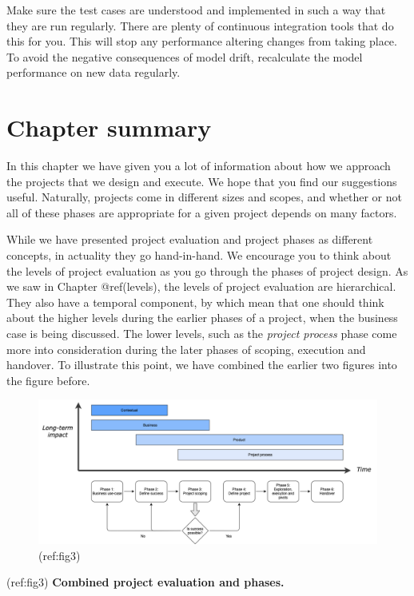 \documentclass[
]{book}
\begin{document}
Make sure the test cases are understood and implemented in such a way
that they are run regularly. There are plenty of continuous integration
tools that do this for you. This will stop any performance altering
changes from taking place. To avoid the negative consequences of model
drift, recalculate the model performance on new data regularly.

\hypertarget{chapter-summary}{%
\section{Chapter summary}\label{chapter-summary}}

In this chapter we have given you a lot of information about how we
approach the projects that we design and execute. We hope that you find
our suggestions useful. Naturally, projects come in different sizes and
scopes, and whether or not all of these phases are appropriate for a
given project depends on many factors.

While we have presented project evaluation and project phases as
different concepts, in actuality they go hand-in-hand. We encourage you
to think about the levels of project evaluation as you go through the
phases of project design. As we saw in Chapter @ref(levels), the levels
of project evaluation are hierarchical. They also have a temporal
component, by which mean that one should think about the higher levels
during the earlier phases of a project, when the business case is being
discussed. The lower levels, such as the \emph{project process} phase
come more into consideration during the later phases of scoping,
execution and handover. To illustrate this point, we have combined the
earlier two figures into the figure before.

\begin{smaller}

\begin{figure}
\includegraphics[width=1\linewidth]{figures/Framework phases} \caption{(ref:fig3)}\label{fig:full-figure}
\end{figure}

(ref:fig3) \textbf{Combined project evaluation and phases.}

\end{smaller}
\end{document}
